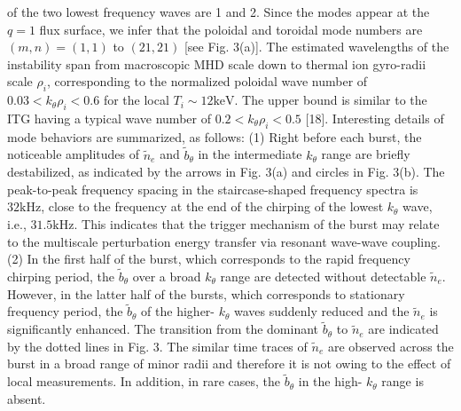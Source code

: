 \documentclass[10pt]{article}
\begin{document}
of the two lowest frequency waves are 1 and 2. Since the modes appear at the $q=1$ flux surface, we infer that the poloidal and toroidal mode numbers are $(m, n)=(1,1)$ to $(21,21)$ [see Fig. 3(a)]. The estimated wavelengths of the instability span from macroscopic MHD scale down to thermal ion gyro-radii scale $\rho_{i}$, corresponding to the normalized poloidal wave number of $0.03<k_{\theta} \rho_{i}<0.6$ for the local $T_{i} \sim 12 \mathrm{keV}$. The upper bound is similar to the ITG having a typical wave number of $0.2<k_{\theta} \rho_{i}<0.5$ [18]. Interesting details of mode behaviors are summarized, as follows: (1) Right before each burst, the noticeable amplitudes of $\tilde{n}_{e}$ and $\tilde{b}_{\theta}$ in the intermediate $k_{\theta}$ range are briefly destabilized, as indicated by the arrows in Fig. 3(a) and circles in Fig. 3(b). The peak-to-peak frequency spacing in the staircase-shaped frequency spectra is $32 \mathrm{kHz}$, close to the frequency at the end of the chirping of the lowest $k_{\theta}$ wave, i.e., $31.5 \mathrm{kHz}$. This indicates that the trigger mechanism of the burst may relate to the multiscale perturbation energy transfer via resonant wave-wave coupling. (2) In the first half of the burst, which corresponds to the rapid frequency chirping period, the $\tilde{b}_{\theta}$ over a broad $k_{\theta}$ range are detected without detectable $\tilde{n}_{e}$. However, in the latter half of the bursts, which corresponds to stationary frequency period, the $\tilde{b}_{\theta}$ of the higher- $k_{\theta}$ waves suddenly reduced and the $\tilde{n}_{e}$ is significantly enhanced. The transition from the dominant $\tilde{b}_{\theta}$ to $\tilde{n}_{e}$ are indicated by the dotted lines in Fig. 3. The similar time traces of $\tilde{n}_{e}$ are observed across the burst in a broad range of minor radii and therefore it is not owing to the effect of local measurements. In addition, in rare cases, the $\tilde{b}_{\theta}$ in the high- $k_{\theta}$ range is absent.
\end{document}
